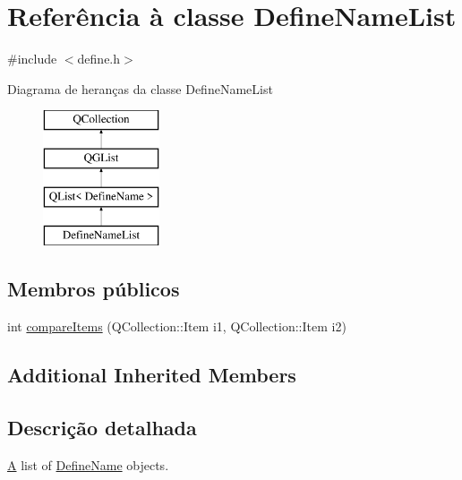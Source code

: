 \hypertarget{class_define_name_list}{\section{Referência à classe Define\-Name\-List}
\label{class_define_name_list}
}


{\ttfamily \#include $<$define.\-h$>$}

Diagrama de heranças da classe Define\-Name\-List\begin{figure}[H]
\begin{center}
\leavevmode
\includegraphics[height=4.000000cm]{class_define_name_list}
\end{center}
\end{figure}
\subsection*{Membros públicos}
\begin{DoxyCompactItemize}
\item 
int \hyperlink{class_define_name_list_a44ca4833fab8a8d30ea70614e7d47753}{compare\-Items} (Q\-Collection\-::\-Item i1, Q\-Collection\-::\-Item i2)
\end{DoxyCompactItemize}
\subsection*{Additional Inherited Members}


\subsection{Descrição detalhada}
\hyperlink{class_a}{A} list of \hyperlink{class_define_name}{Define\-Name} objects. 

